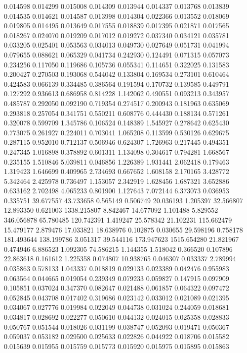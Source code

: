0.014598
0.014299
0.015008
0.014309
0.013944
0.014337
0.013768
0.013839
0.014535
0.014621
0.014587
0.013998
0.014304
0.022366
0.013552
0.018069
0.019805
0.014495
0.013649
0.017555
0.018839
0.017395
0.021871
0.017565
0.018267
0.024070
0.019209
0.017012
0.019272
0.037340
0.034121
0.035781
0.033205
0.025401
0.053563
0.034013
0.049730
0.027649
0.051731
0.041994
0.079655
0.088621
0.065329
0.041734
0.242930
0.124491
0.071315
0.057073
0.234256
0.117050
0.119686
0.105736
0.055341
0.114651
0.322025
0.131583
0.200427
0.270503
0.193068
0.544042
0.133804
0.169534
0.273101
0.610464
0.424583
0.066139
0.334485
0.386564
0.191594
0.170732
0.139585
0.449791
0.127292
0.936613
0.686958
0.814228
1.142062
0.490551
0.093213
0.343957
0.485787
0.292050
0.092190
0.719354
0.274517
0.200943
0.181963
0.635069
0.293818
0.257054
0.341751
0.550211
0.608776
0.444430
0.188134
0.571261
0.320078
0.599709
1.345786
0.106524
0.148389
1.545927
0.278642
0.625430
0.773075
0.261927
0.224011
0.703041
1.065208
0.113599
0.530126
0.629675
0.287115
0.952010
0.712137
0.506946
0.624307
1.726963
0.217445
0.494351
0.247345
1.016898
0.378892
0.601311
1.134098
0.304617
0.794281
1.668567
0.235155
1.510846
5.039811
0.046856
1.226389
1.931441
2.062418
0.179463
1.319423
1.646699
0.409965
2.734693
0.667652
1.608158
2.170165
3.428772
5.342464
2.425978
0.736497
1.153057
2.342919
1.628456
1.687321
3.652886
0.633162
2.702498
4.065233
0.801900
1.127643
7.072144
6.373073
0.036953
0.335751
39.677557
43.733658
0.565149
0.506749
20.036193
1.205397
32.566807
12.893350
0.621003
1338.215807
8.842467
14.677092
1.101488
5.829552
346.056878
65.780485
120.742391
1.419247
25.578342
21.102231
115.662479
15.479177
2.879476
17.033821
18.638976
0.102875
0.030655
29.598196
0.758178
181.493644
138.199786
3.051317
39.544116
173.947623
1515.654280
21.821967
0.474946
6.886523
1.092305
74.586215
1.144355
1.518042
0.366520
0.107896
22.863618
0.161612
1.225358
0.074807
10.938765
0.046307
0.033337
2.789994
0.035863
0.578133
1.043337
0.018819
0.029133
0.023389
0.042476
0.955983
0.063564
0.044665
0.019054
0.239349
0.079233
0.059827
0.147915
0.097909
0.105851
0.037024
0.347370
0.082647
0.021488
0.061857
0.064322
0.097472
0.052845
0.043708
0.017402
0.319686
0.023142
0.033012
0.021089
0.021395
0.034067
0.027776
0.019984
0.022049
0.044738
0.031024
0.244059
0.018681
0.034817
0.028692
0.022277
0.050610
0.044132
0.024015
0.025358
0.028833
0.050767
0.051544
0.018026
0.031199
0.038747
0.052093
0.019471
0.050367
0.059037
0.053182
0.029500
0.025633
0.022826
0.044922
0.018706
0.015582
0.015639
0.015955
0.015759
0.015773
0.015920
0.015975
0.015895
0.015863
